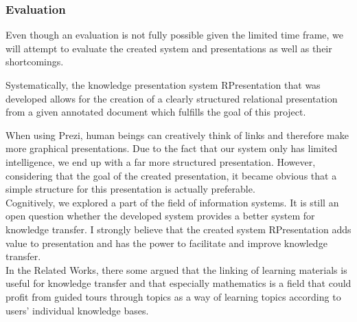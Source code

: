 
\begin{frame}
  \frametitle{Evaluation}
  \begin{module}[id=evaluation]

Even though an evaluation is not fully possible given the limited time frame, we will attempt to evaluate the created system and presentations as well as their shortcomings. 


Systematically, the knowledge presentation system RPresentation that was developed allows for the creation of a clearly structured relational presentation from a given annotated document which fulfills the goal of this project.

When using Prezi, human beings can creatively think of links and therefore make more graphical presentations. Due to the fact that our system only has limited intelligence, we end up with a far more structured presentation. However, considering that the goal of the created presentation, it became obvious that a simple structure for this presentation is actually preferable.\\

Cognitively, we explored a part of the field of information systems. It is still an open question whether the developed system provides a better system for knowledge transfer. I strongly believe that the created system RPresentation adds value to presentation and has the power to facilitate and improve knowledge transfer.\\

In the Related Works, there some argued that the linking of learning materials is useful for knowledge transfer and that especially mathematics is a field that could profit from guided tours through topics as a way of learning topics according to users' individual knowledge bases.\\



  \end{module}
\end{frame}
